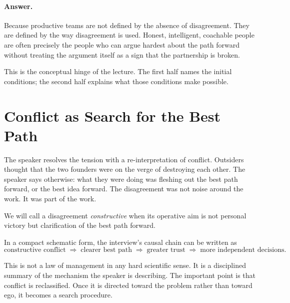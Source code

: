 \paragraph{Answer.} Because productive teams are not defined by the absence of disagreement. They are defined by the way disagreement is used. Honest, intelligent, coachable people are often precisely the people who can argue hardest about the path forward without treating the argument itself as a sign that the partnership is broken.

This is the conceptual hinge of the lecture. The first half names the initial conditions; the second half explains what those conditions make possible.

\section{Conflict as Search for the Best Path}

The speaker resolves the tension with a re-interpretation of conflict. Outsiders thought that the two founders were on the verge of destroying each other. The speaker says otherwise: what they were doing was fleshing out the best path forward, or the best idea forward. The disagreement was not noise around the work. It was part of the work.

\begin{definition}
We will call a disagreement \emph{constructive} when its operative aim is not personal victory but clarification of the best path forward.
\end{definition}

In a compact schematic form, the interview's causal chain can be written as
\begin{equation}
\text{constructive conflict}
\;\Rightarrow\;
\text{clearer best path}
\;\Rightarrow\;
\text{greater trust}
\;\Rightarrow\;
\text{more independent decisions}.
\end{equation}

This is not a law of management in any hard scientific sense. It is a disciplined summary of the mechanism the speaker is describing. The important point is that conflict is reclassified. Once it is directed toward the problem rather than toward ego, it becomes a search procedure.

